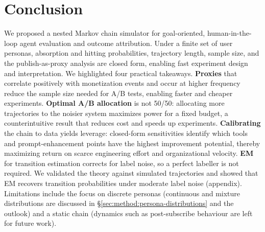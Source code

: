 \section{Conclusion}
\label{sec:conclusion}

We proposed a nested Markov chain simulator for goal-oriented, human-in-the-loop agent evaluation and outcome attribution. Under a finite set of user personas, absorption and hitting probabilities, trajectory length, sample size, and the publish-as-proxy analysis are closed form, enabling fast experiment design and interpretation. We highlighted four practical takeaways. \textbf{Proxies} that correlate positively with monetization events and occur at higher frequency reduce the sample size needed for A/B tests, enabling faster and cheaper experiments. \textbf{Optimal A/B allocation} is not 50/50: allocating more trajectories to the noisier system maximizes power for a fixed budget, a counterintuitive result that reduces cost and speeds up experiments. \textbf{Calibrating} the chain to data yields leverage: closed-form sensitivities identify which tools and prompt-enhancement points have the highest improvement potential, thereby maximizing return on scarce engineering effort and organizational velocity. \textbf{EM} for transition estimation corrects for label noise, so a perfect labeller is not required. We validated the theory against simulated trajectories and showed that EM recovers transition probabilities under moderate label noise (appendix). Limitations include the focus on discrete personas (continuous and mixture distributions are discussed in \S\ref{sec:method:persona-distributions} and the outlook) and a static chain (dynamics such as post-subscribe behaviour are left for future work).
